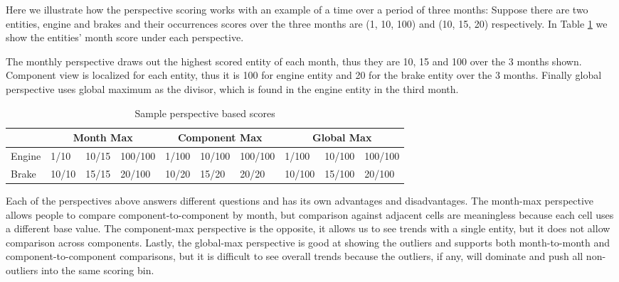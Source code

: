 Here we illustrate how the perspective scoring works with an example of a time
over a period of three months: Suppose there are two entities, engine and brakes
and their occurrences scores over the three months are (1, 10, 100) and (10, 15,
20) respectively. In Table \ref{table:perspective} we show the entities' month
score under each perspective.

The monthly perspective draws out the
highest scored entity of each month, thus they are 10, 15 and 100 over the 3
months shown. Component view is localized for each entity, thus it is 100 for
engine entity and 20 for the brake entity over the 3 months. Finally global
perspective uses global maximum as the divisor, which is found in the engine
entity in the third month.
 
    \begin{table}[h]
	\begin{tabular}{| l | lll | lll | lll | 
	      } 
	   \hline
	   & \multicolumn{3}{|c|}{Month Max} 
	   & \multicolumn{3}{|c|}{Component Max} 
	   & \multicolumn{3}{|c|}{Global Max} \\
	   
	   \hline
	   Engine & %
	            1/10 & 10/15 & 100/100 &      %
	            1/100 & 10/100 & 100/100 &    %
	            1/100 & 10/100 & 100/100 \\   %
	            
	   Brake &  %
	            10/10 & 15/15 & 20/100 &      %
	            10/20 & 15/20 & 20/20  &      %
	            10/100 & 15/100 & 20/100 \\   %
	   \hline
	\end{tabular} 
	\caption{Sample perspective based scores} 
	\label{table:perspective}
	\end{table}
  
Each of the perspectives above answers different questions and has its own
advantages and disadvantages. The month-max perspective allows people to compare 
component-to-component by month, but comparison against adjacent cells are 
meaningless because each cell uses a different base value. The component-max 
perspective is the opposite, it allows us to see trends with a single entity, 
but it does not allow comparison across components. Lastly, the global-max 
perspective is good at showing the outliers and supports both month-to-month 
and component-to-component comparisons, but it is difficult to see overall
trends because the outliers, if any, will dominate and push all non-outliers
into the same scoring bin.

